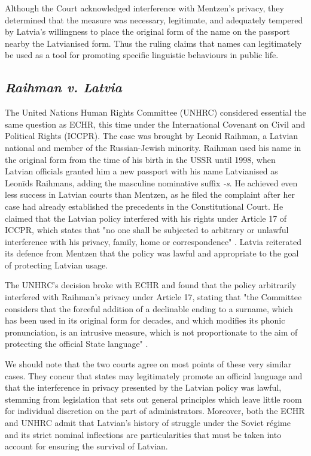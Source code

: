 Although the Court acknowledged interference with Mentzen's privacy, they determined that the measure was necessary, legitimate, and adequately tempered by Latvia's willingness to place the original form of the name on the passport nearby the Latvianised form. Thus the ruling claims that names can legitimately be used as a tool for promoting specific linguistic behaviours in public life.

\subsection{\textit{Raihman v. Latvia}}

The United Nations Human Rights Committee (UNHRC) considered essential the same question as ECHR, this time under the International Covenant on Civil and Political Rights (ICCPR). The case was brought by Leonid Raihman, a Latvian national and member of the Russian-Jewish minority. Raihman used his name in the original form from the time of his birth in the USSR until 1998, when Latvian officials granted him a new passport with his name Latvianised as Leonīds Raihmans, adding the masculine nominative suffix \textit{-s}. He achieved even less success in Latvian courts than Mentzen, as he filed the complaint after her case had already established the precedents in the Constitutional Court. He claimed that the Latvian policy interfered with his rights under Article 17 of ICCPR, which states that "no one shall be subjected to arbitrary or unlawful interference with his privacy, family, home or correspondence" \parencite{iccpr}. Latvia reiterated its defence from Mentzen that the policy was lawful and appropriate to the goal of protecting Latvian usage.

The UNHRC's decision broke with ECHR and found that the policy arbitrarily interfered with Raihman's privacy under Article 17, stating that "the Committee considers that the forceful addition of a declinable ending to a surname, which has been used in its original form for decades, and which modifies its phonic pronunciation, is an intrusive measure, which is not proportionate to the aim of protecting the official State language" \parencite[8.3]{raihman10}.

We should note that the two courts agree on most points of these very similar cases. They concur that states may legitimately promote an official language and that the interference in privacy presented by the Latvian policy was lawful, stemming from legislation that sets out general principles which leave little room for individual discretion on the part of administrators. Moreover, both the ECHR and UNHRC admit that Latvian's history of struggle under the Soviet régime and its strict nominal inflections are particularities that must be taken into account for ensuring the survival of Latvian.


